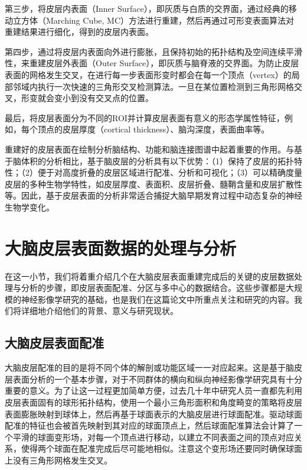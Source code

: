 第三步，将皮层内表面（Inner Surface），即灰质与白质的交界面，通过经典的移动立方体（Marching Cube, MC）方法\cite{lorensen1987marching}进行重建，然后再通过可形变表面算法对重建结果进行细化，得到的皮层内表面。

第四步，通过将皮层内表面向外进行膨胀，且保持初始的拓扑结构及空间连续平滑性，来重建皮层外表面（Outer Surface），即灰质与脑脊液的交界面。为防止皮层表面的网格发生交叉，在进行每一步表面形变时都会在每一个顶点（vertex）的局部邻域内执行一次快速的三角形交叉检测算法。一旦在某位置检测到三角形网格交叉，形变就会变小到没有交叉点的位置。

最后，将皮层表面分为不同的ROI并计算皮层表面有意义的形态学属性特征，例如，每个顶点的皮层厚度（cortical thickness）、脑沟深度，表面曲率等\cite{li2014mapping}。

重建好的皮层表面在绘制分析脑结构、功能和脑连接图谱中起着重要的作用。与基于脑体积的分析相比，基于脑皮层的分析具有以下优势：（1）保持了皮层的拓扑特性；（2）便于对高度折叠的皮层区域进行配准、分析和可视化；（3）可以精确度量皮层的多种生物学特性，如皮层厚度、表面积、皮层折叠、髓鞘含量和皮层扩散性等。因此，基于皮层表面的分析非常适合捕捉大脑早期发育过程中动态复杂的神经生物学变化。


\section{大脑皮层表面数据的处理与分析}
在这一小节，我们将着重介绍几个在大脑皮层表面重建完成后的关键的皮层数据处理与分析的步骤，即皮层表面配准、分区与多中心的数据结合。这些步骤都是大规模的神经影像学研究的基础，也是我们在这篇论文中所重点关注和研究的内容。我们将详细地介绍他们的背景、意义与研究现状。

\subsection{大脑皮层表面配准}\label{sec:大脑皮层表面配准}
大脑皮层配准的目的是将不同个体的解剖或功能区域一一对应起来。这是基于脑皮层表面分析的一个基本步骤，对于不同群体的横向和纵向神经影像学研究具有十分重要的意义。为了让这一过程更加简单方便，过去几十年中研究人员一直都先利用皮层表面固有的球形拓扑结构，使用一个最小三角形面积和角度畸变的策略将皮层表面膨胀映射到球体上\cite{fischl1999cortical,fischl1999high}，然后再基于球面表示的大脑皮层进行球面配准\cite{yeo2009spherical,robinson2014msm}。驱动球面配准的特征也会被首先映射到其对应的球面顶点上，然后球面配准算法会计算了一个平滑的球面变形场，对每一个顶点进行移动，以建立不同表面之间的顶点对应关系，使得两个球面在配准完成后尽可能地相似。注意这个变形场还要同时确保球面上没有三角形网格发生交叉\cite{moller1997fast}。

